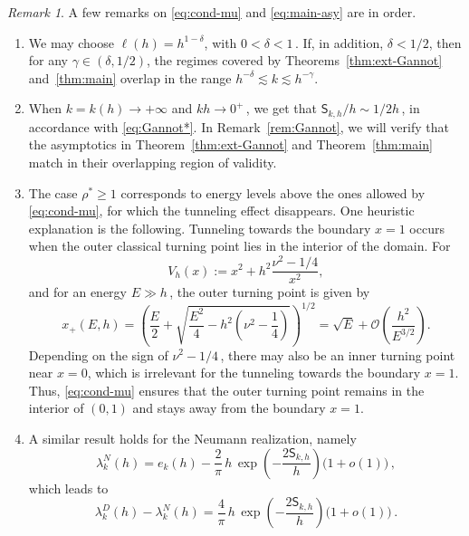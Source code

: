 \documentclass[11pt]{amsart}
\numberwithin{equation}{section}
\theoremstyle{remark}
\newtheorem{remark}[theorem]{Remark}
\begin{document}
\begin{remark}\label{rem:main} A few remarks on \eqref{eq:cond-mu} and \eqref{eq:main-asy} are in order.
\begin{enumerate}[\rm i)] 
\item We may choose $\ell(h)=h^{1-\delta}$, with $0<\delta<1\,$.
If, in addition, $\delta<1/2$, then for any
$\gamma\in(\delta,1/2)$, the regimes covered by
Theorems~\ref{thm:ext-Gannot} and~\ref{thm:main} overlap in the range
$
h^{-\delta}\lesssim k\lesssim h^{-\gamma}.
$
%
\item When $k=k(h)\to+\infty$ and $kh\to0^+\,$, we get that $\mathsf S_{k,h}/h\sim 1/2h\,$, in accordance with \eqref{eq:Gannot*}. In Remark~\ref{rem:Gannot}, we will verify that the asymptotics in Theorem~\ref{thm:ext-Gannot} and Theorem~\ref{thm:main} match  in their overlapping region of validity.
%
\item The case $\rho^*\geq 1$ corresponds to energy levels  above the
ones allowed by \eqref{eq:cond-mu}, for which the tunneling effect
disappears.
One heuristic explanation is the following. Tunneling towards the
boundary $x=1$ occurs when the outer classical turning point lies in
the interior of the domain. For
\[
V_h(x):=x^2+h^2\frac{\nu^2-1/4}{x^2},
\]
and for an energy $E\gg h\,$, the outer turning point is given by
\[
x_+(E,h)
=
\left(
\frac{E}{2}
+
\sqrt{\frac{E^2}{4}
-h^2\left(\nu^2-\frac14\right)}
\right)^{1/2}
=
\sqrt{E}
+
\mathcal O\left(\frac{h^2}{E^{3/2}}\right).
\]
Depending on the sign of $\nu^2-1/4\,$, there may also be an inner
turning point near $x=0$, which is irrelevant for the tunneling
towards the boundary $x=1$. Thus, \eqref{eq:cond-mu} ensures that the
outer turning point remains in the interior of $(0,1)$ and stays away
from the boundary $x=1$.
\item A similar result holds for the Neumann realization, namely
\[\lambda_k^N(h)
	=
	e_k(h)
	-
	\frac{2}{\pi}\,h\, \exp\!\left(-\frac{2\mathsf S_{k,h}}{h}\right)
	\bigl(1+o(1)\bigr)\,,\]
%
which leads to 
\[\lambda_k^D(h)-\lambda_k^N(h)=
	\frac{4}{\pi}\,h\,\exp\!\left(-\frac{2\mathsf S_{k,h}}{h}\right)
	\bigl(1+o(1)\bigr)\,.\]
\end{enumerate}
%
%
%
\end{remark}
\end{document}
